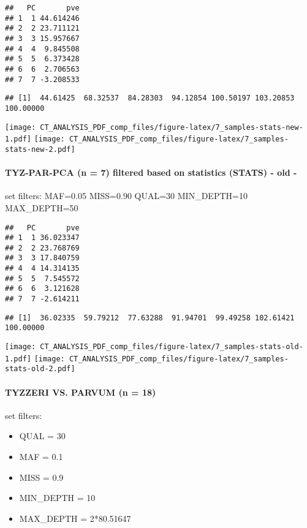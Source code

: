 \documentclass[
]{article}
\providecommand{\tightlist}{%
  \setlength{\itemsep}{0pt}\setlength{\parskip}{0pt}}
\begin{document}
\begin{verbatim}
##   PC       pve
## 1  1 44.614246
## 2  2 23.711121
## 3  3 15.957667
## 4  4  9.845508
## 5  5  6.373428
## 6  6  2.706563
## 7  7 -3.208533
\end{verbatim}

\begin{verbatim}
## [1]  44.61425  68.32537  84.28303  94.12854 100.50197 103.20853 100.00000
\end{verbatim}

\texttt{[image: CT\_ANALYSIS\_PDF\_comp\_files/figure-latex/7\_samples-stats-new-1.pdf]}
\texttt{[image: CT\_ANALYSIS\_PDF\_comp\_files/figure-latex/7\_samples-stats-new-2.pdf]}

\hypertarget{tyz-par-pca-n-7-filtered-based-on-statistics-stats---old--}{%
\paragraph{TYZ-PAR-PCA (n = 7) filtered based on statistics (STATS) -
old
-}\label{tyz-par-pca-n-7-filtered-based-on-statistics-stats---old--}}

set filters: MAF=0.05 MISS=0.90 QUAL=30 MIN\_DEPTH=10 MAX\_DEPTH=50

\begin{verbatim}
##   PC       pve
## 1  1 36.023347
## 2  2 23.768769
## 3  3 17.840759
## 4  4 14.314135
## 5  5  7.545572
## 6  6  3.121628
## 7  7 -2.614211
\end{verbatim}

\begin{verbatim}
## [1]  36.02335  59.79212  77.63288  91.94701  99.49258 102.61421 100.00000
\end{verbatim}

\texttt{[image: CT\_ANALYSIS\_PDF\_comp\_files/figure-latex/7\_samples-stats-old-1.pdf]}
\texttt{[image: CT\_ANALYSIS\_PDF\_comp\_files/figure-latex/7\_samples-stats-old-2.pdf]}

\hypertarget{tyzzeri-vs.-parvum-n-18}{%
\paragraph{TYZZERI VS. PARVUM (n = 18)}\label{tyzzeri-vs.-parvum-n-18}}

set filters:

\begin{itemize}
\tightlist
\item
  QUAL = 30
\item
  MAF = 0.1
\item
  MISS = 0.9
\item
  MIN\_DEPTH = 10
\item
  MAX\_DEPTH = 2*80.51647
\end{itemize}
\end{document}

